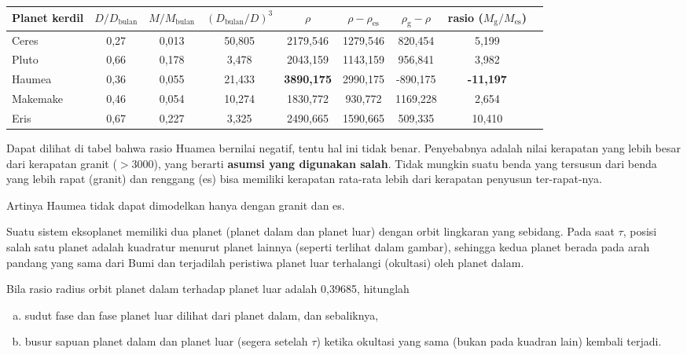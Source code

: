 \documentclass[11pt,fleqn]{exam}
\begin{document}
\begin{questions}
\begin{table}[h!]
\centering
\begin{tabular}{|l|c|c|c|c|c|c|c|c|}
\hline
Planet kerdil & $D/D_{\text{bulan}}$ & $M/M_{\text{bulan}}$ & $(D_{\text{bulan}}/D)^3$ & $\rho$ & $\rho - \rho_{\text{es}}$ & $\rho_{\text{g}} - \rho$ & rasio ($M_{\text{g}} / M_{\text{es}}$)\\
\hline
\hline
Ceres & 0,27 & 0,013 & 50,805 & 2179,546 & 1279,546 & 820,454 & 5,199 \\
\hline
Pluto & 0,66 & 0,178 & 3,478 & 2043,159 & 1143,159 & 956,841 & 3,982 \\
\hline
Haumea & 0,36 & 0,055 & 21,433 & \textbf{3890,175} & 2990,175 & -890,175 & \textbf{-11,197} \\
\hline
Makemake & 0,46 & 0,054 & 10,274 & 1830,772 & 930,772 & 1169,228 & 2,654 \\
\hline
Eris & 0,67 & 0,227 & 3,325 & 2490,665 & 1590,665 & 509,335 & 10,410 \\
\hline
\end{tabular}
\end{table}

Dapat dilihat di tabel bahwa rasio Huamea bernilai negatif, tentu hal ini tidak benar. Penyebabnya adalah nilai kerapatan yang lebih besar dari kerapatan granit ($> 3000$), yang berarti \textbf{asumsi yang digunakan salah}. Tidak mungkin suatu benda yang tersusun dari benda yang lebih rapat (granit) dan renggang (es) bisa memiliki kerapatan rata-rata lebih dari kerapatan penyusun ter-rapat-nya. 

Artinya Haumea tidak dapat dimodelkan hanya dengan granit dan es.

\vspace{0.3cm}
\question Suatu sistem eksoplanet memiliki dua planet (planet dalam dan planet luar) dengan orbit lingkaran yang sebidang. Pada saat $\tau$, posisi salah satu planet adalah kuadratur menurut planet lainnya (seperti terlihat dalam gambar), sehingga kedua planet berada pada arah pandang yang sama dari Bumi dan terjadilah peristiwa planet luar terhalangi (okultasi) oleh planet dalam.

Bila rasio radius orbit planet dalam terhadap planet luar adalah 0,39685, hitunglah

\begin{enumerate}[(a)]
\item sudut fase dan fase planet luar dilihat dari planet dalam, dan sebaliknya,
\item busur sapuan planet dalam dan planet luar (segera setelah $\tau$) ketika okultasi yang sama (bukan pada kuadran lain) kembali terjadi.\\
\end{enumerate}



\end{questions}
\end{document}
